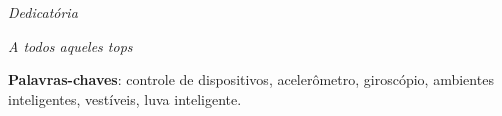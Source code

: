 \documentclass[
	12pt,				%
  oneside,
	a4paper,			%
	chapter=TITLE,		%
	english,			%
	brazil				%
	]{abntex2}
\begin{document}
\frenchspacing


\imprimircapa

\imprimirfolhaderosto

\imprimirfolhadeaprovacao
\begin{dedicatoria}
   \vspace*{\fill}
   \centering
   \noindent
   \textit{ Dedicatória }
   \vspace*{\fill}
\end{dedicatoria}

\begin{agradecimentos}[agradecimentos]


\end{agradecimentos}

\begin{epigrafe}
    \vspace*{\fill}
	\begin{flushright}
		\textit{A todos aqueles tops}
	\end{flushright}
\end{epigrafe}


\setlength{\absparsep}{18pt} %
\begin{resumo}[Resumo]
  \textbf{Palavras-chaves}: controle de dispositivos, acelerômetro, giroscópio, ambientes inteligentes, vestíveis, luva inteligente.
\end{resumo}

\renewcommand{\listfigurename}{Lista de Figuras}
\listoffigures*
\cleardoublepage

\renewcommand{\listtablename}{Lista de Tabelas}
\listoftables*
\cleardoublepage

\end{document}
